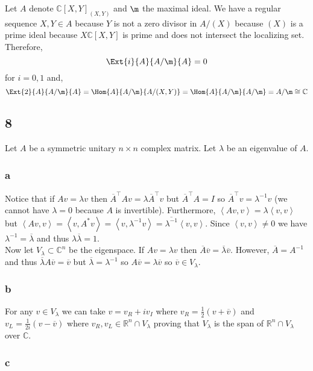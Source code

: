 \documentclass[12pt]{article}
\newcommand{\inner}[2]{\left< #1, #2 \right>}
\newcommand{\R}{\mathbb{R}}
\renewcommand{\C}{\mathbb{C}}
\begin{document}
Let $A$ denote $\C[X,Y]_{(X,Y)}$ and $\m$ the maximal ideal. We have a regular sequence $X,Y \in A$ because $Y$ is not a zero divisor in $A / (X)$ because $(X)$ is a prime ideal because $X \C[X,Y]$ is prime and does not intersect the localizing set. Therefore,
\[ \Ext{i}{A}{A/\m}{A} = 0 \]
for $i = 0,1$ and,
\[ \Ext{2}{A}{A/\m}{A} = \Hom{A}{A/\m}{A/(X,Y)} = \Hom{A}{A/\m}{A/\m} = A/\m \cong \C \]

\subsection{8}

Let $A$ be a symmetric unitary $n \times n$ complex matrix. Let $\lambda$ be an eigenvalue of $A$.

\subsubsection{a}

Notice that if $A v = \lambda v$ then $\overline{A}^\top A v = \lambda \overline{A}^\top v$ but $\overline{A}^\top A = I$ so $\overline{A}^\top v = \lambda^{-1} v$ (we cannot have $\lambda = 0$ because $A$ is invertible). Furthermore, $\inner{A v}{v} = \lambda \inner{v}{v}$ but $\inner{A v}{v} = \inner{v}{A^* v} = \inner{v}{\lambda^{-1} v} = \overline{\lambda^{-1}} \inner{v}{v}$. Since $\inner{v}{v} \neq 0$ we have $\lambda^{-1} = \overline{\lambda}$ and thus $\lambda \overline{\lambda} = 1$. 
\bigskip\\
Now let $V_\lambda \subset \C^n$ be the eigenspace. If $A v = \lambda v$ then $\overline{A} \overline{v} = \overline{\lambda} \overline{v}$. However, $\overline{A} = A^{-1}$ and thus $\overline{\lambda} A \overline{v} = \overline{v}$ but $\overline{\lambda} = \lambda^{-1}$ so $A \overline{v} = \lambda \overline{v}$ so $\overline{v} \in V_\lambda$.

\subsubsection{b}

For any $v \in V_\lambda$ we can take $v = v_R + i v_I$ where $v_R = \tfrac{1}{2}(v + \overline{v})$ and $v_L = \tfrac{1}{2i}(v - \overline{v})$ where $v_R, v_L \in \R^n \cap V_\lambda$ proving that $V_\lambda$ is the span of $\R^n \cap V_\lambda$ over $\C$.

\subsubsection{c}
\end{document}
